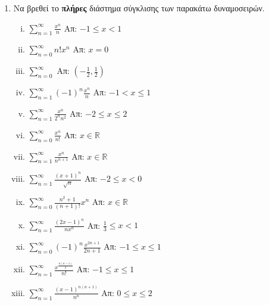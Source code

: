 



\everymath{\displaystyle}
\thispagestyle{empty}




\begin{center}
\end{center}

\vspace{\baselineskip}

\begin{enumerate}
  \item Να βρεθεί το \textbf{πλήρες} διάστημα σύγκλισης των παρακάτω δυναμοσειρών.

  \begin{enumerate}[i)]
    \item $\sum_{n=1}^{\infty} \frac{x^{n}}{n}$ \hfill Απ: $-1\leq x <1$
    \item $\sum_{n=0}^{\infty} n!x^{n}$ \hfill Απ: $x=0$
    \item $\sum_{n=0}^{\infty}$ \hfill  Απ: $(-\frac{1}{2},\frac{1}{2})$
    \item $\sum_{n=1}^{\infty} (-1)^{n}\frac{x^{n}}{n}$ \hfill Απ: $-1<x\leq 1$
    \item $\sum_{n=1}^{\infty} \frac{x^{n}}{2^{n}n^{2}}$ \hfill Απ: $-2\leq x \leq 2$
    \item $\sum_{n=0}^{\infty} \frac{x^{n}}{n!}$ \hfill Απ: $x\in \mathbb{R}$
    \item $\sum_{n=1}^{\infty} \frac{x^{n}}{n^{n+1}}$ \hfill Απ: $x\in \mathbb{R}$
    \item $\sum_{n=1}^{\infty} \frac{(x+1)^{n}}{\sqrt{n}}$ \hfill Απ: $-2\leq x <0$
    \item $\sum_{n=0}^{\infty} \frac{n^{2}+1}{(n+1)!}x^{n}$ \hfill Απ: $x\in\mathbb{R}$
    \item $\sum_{n=1}^{\infty} \frac{(2x-1)^{n}}{nx^{n}}$ \hfill Απ: $\frac{1}{3}\leq x<1$
    \item $\sum_{n=0}^{\infty} (-1)^{n}\frac{x^{2n+1}}{2n+1}$ \hfill Απ: $-1\leq x\leq 1$
    \item $\sum_{n=1}^{\infty} \frac{x^{\frac{n(n-1)}{2}}}{n!}$ \hfill Απ: $-1\leq x\leq 1$
    \item $\sum_{n=1}^{\infty} \frac{(x-1)^{n(n+1)}}{n^{n}}$ \hfill Απ: $0\leq x \leq 2$

  \end{enumerate}

\end{enumerate}


